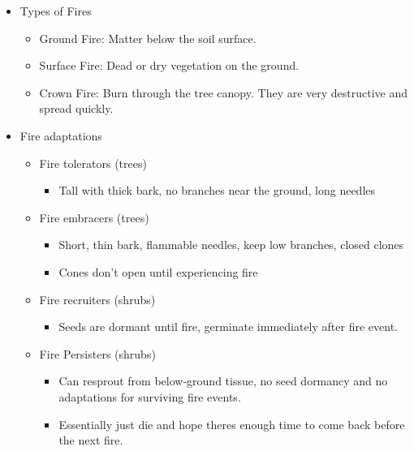 \documentclass[12pt]{article}
\begin{document}
\begin{itemize}
    \item Types of Fires
          \begin{itemize}
              \item Ground Fire: Matter below the soil surface.
              \item Surface Fire: Dead or dry vegetation on the ground.
              \item Crown Fire: Burn through the tree canopy. They are very destructive and spread quickly.
          \end{itemize}
    \item Fire adaptations
          \begin{itemize}
              \item Fire tolerators (trees)
                    \begin{itemize}
                        \item Tall with thick bark, no branches near the ground, long needles
                    \end{itemize}
              \item Fire embracers (trees)
                    \begin{itemize}
                        \item Short, thin bark, flammable needles, keep low branches, closed clones
                        \item Cones don't open until experiencing fire
                    \end{itemize}
              \item Fire recruiters (shrubs)
                    \begin{itemize}
                        \item Seeds are dormant until fire, germinate immediately after fire event.
                    \end{itemize}
              \item Fire Persisters (shrubs)
                    \begin{itemize}
                        \item Can resprout from below-ground tissue, no seed dormancy and no adaptations for surviving fire events.
                        \item Essentially just die and hope theres enough time to come back before the next fire.
                    \end{itemize}
          \end{itemize}

\end{itemize}
\end{document}
